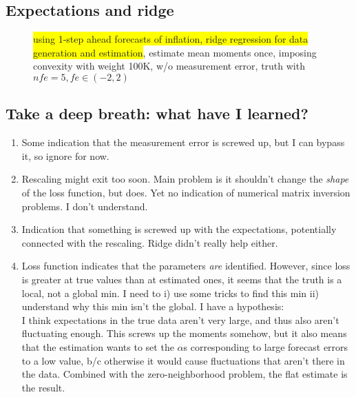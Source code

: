 \documentclass[11pt]{article}
\def \myFigPath {../../figures/}
\renewcommand{\[}{\begin{equation}}
\renewcommand{\]}{\end{equation}}
\begin{document}
\clearpage
\subsection{Expectations and ridge}
\begin{figure}[h!]
\caption{\colorbox{yellow}{using 1-step ahead forecasts of inflation, ridge regression for data generation and estimation}, estimate mean moments once, imposing convexity with weight 100K, w/o measurement error, truth with $nfe=5, fe \in(-2,2)$}
\end{figure}

\clearpage
\subsection{Take a deep breath: what have I learned?}
\begin{enumerate}
\item Some indication that the measurement error is screwed up, but I can bypass it, so ignore for now.
\item Rescaling might exit too soon. Main problem is it shouldn't change the \emph{shape} of the loss function, but does. Yet no indication of numerical matrix inversion problems. I don't understand.
\item Indication that something is screwed up with the expectations, potentially connected with the rescaling. Ridge didn't really help either. 
\item Loss function indicates that the parameters \emph{are} identified. However, since loss is greater at true values than at estimated ones, it seems that the truth is a local, not a global min. I need to i) use some tricks to find this min ii) understand why this min isn't the global. I have a hypothesis: \\
I think expectations in the true data aren't very large, and thus also aren't fluctuating enough. This screws up the moments somehow, but it also means that the estimation wants to set the $\alpha$s corresponding to large forecast errors to a low value, b/c otherwise it would cause fluctuations that aren't there in the data. Combined with the zero-neighborhood problem, the flat estimate is the result.
\end{enumerate}
\end{document}
